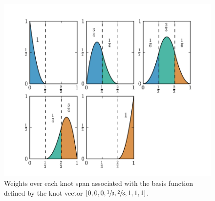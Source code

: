 \documentclass{article}
\begin{document}
\begin{figure}[htb]
  \centering
  \includegraphics[width=5in]{weights.pdf}
  \caption{\label{fig:weights}Weights over each knot span associated
    with the basis function defined by the knot vector
    $[0,0,0,\sfrac{1}{3},\sfrac{2}{3},1,1,1]$.} 
\end{figure}
\end{document}
